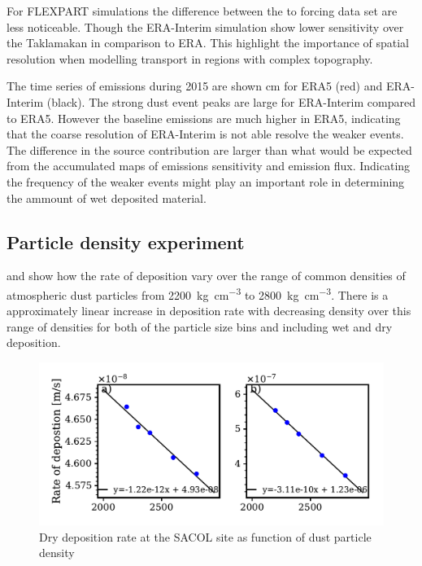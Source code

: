For FLEXPART simulations the difference between the to forcing data set are less noticeable. Though the ERA-Interim simulation show lower sensitivity over the Taklamakan in comparison to ERA. This highlight the importance of spatial resolution when modelling transport in regions with complex topography. 

\par The time series of emissions during 2015 are shown cm for ERA5 (red) and ERA-Interim (black). The strong dust event peaks are large for ERA-Interim compared to ERA5. However the baseline emissions are much higher in ERA5, indicating that the coarse resolution of ERA-Interim is not able resolve the weaker events. The difference in the source contribution are larger than what would be expected from the accumulated maps of emissions sensitivity and emission flux. Indicating the frequency of the weaker events might play an important role in determining the ammount of wet deposited material.   


\subsection{Particle density experiment}
 and  show how the rate of deposition vary over the range of common densities of atmospheric dust particles from \SI{2200}{\kg\per\cubic\cm} to \SI{2800}{\kg\per\cubic\cm}. There is a approximately linear increase in deposition rate with decreasing density over this range of densities for both of the particle size bins and including wet and dry deposition.   

\begin{figure}[hptb]
    \centering
    \includegraphics[width=\textwidth]{texfiles/figs/drydep_function_of_density.pdf}
    \caption{Dry deposition rate at the SACOL site as function of dust particle density}
    \label{fig:dry_dep_density}
\end{figure}

